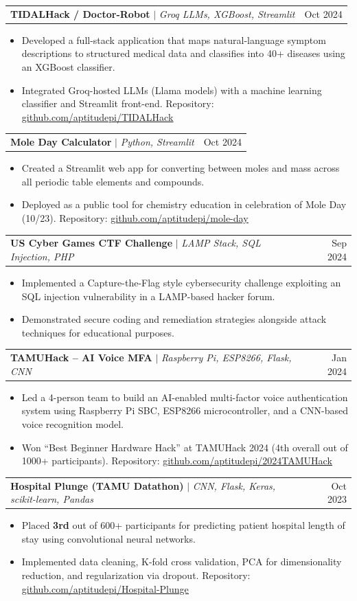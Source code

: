 \documentclass[letterpaper,11pt]{article}
\makeatletter
\newcommand{\resumeItem}[1]{
  \item\small{
    {#1 \vspace{-2pt}}
  }
}
\newcommand{\resumeProjectHeading}[2]{
    \item
    \begin{tabular*}{0.97\textwidth}{l@{\extracolsep{\fill}}r}
      \small#1 & #2 \\
    \end{tabular*}\vspace{-7pt}
}
\newcommand{\resumeItemListStart}{\begin{itemize}}
\newcommand{\resumeItemListEnd}{\end{itemize}\vspace{-5pt}}
\makeatother
\begin{document}
    \resumeProjectHeading
      {\textbf{TIDALHack / Doctor-Robot} $|$ \emph{Groq LLMs, XGBoost, Streamlit}}{Oct 2024}
      \resumeItemListStart
        \resumeItem{Developed a full-stack application that maps natural-language symptom descriptions to structured medical data and classifies into 40+ diseases using an XGBoost classifier.}
        \resumeItem{Integrated Groq-hosted LLMs (Llama models) with a machine learning classifier and Streamlit front-end. Repository: \href{https://github.com/aptitudepi/TIDALHack}{\underline{github.com/aptitudepi/TIDALHack}}}
      \resumeItemListEnd

    \resumeProjectHeading
      {\textbf{Mole Day Calculator} $|$ \emph{Python, Streamlit}}{Oct 2024}
      \resumeItemListStart
        \resumeItem{Created a Streamlit web app for converting between moles and mass across all periodic table elements and compounds.}
        \resumeItem{Deployed as a public tool for chemistry education in celebration of Mole Day (10/23). Repository: \href{https://github.com/aptitudepi/mole-day}{\underline{github.com/aptitudepi/mole-day}}}
      \resumeItemListEnd

    \resumeProjectHeading
      {\textbf{US Cyber Games CTF Challenge} $|$ \emph{LAMP Stack, SQL Injection, PHP}}{Sep 2024}
      \resumeItemListStart
        \resumeItem{Implemented a Capture-the-Flag style cybersecurity challenge exploiting an SQL injection vulnerability in a LAMP-based hacker forum.}
        \resumeItem{Demonstrated secure coding and remediation strategies alongside attack techniques for educational purposes.}
      \resumeItemListEnd

    \resumeProjectHeading
      {\textbf{TAMUHack -- AI Voice MFA} $|$ \emph{Raspberry Pi, ESP8266, Flask, CNN}}{Jan 2024}
      \resumeItemListStart
        \resumeItem{Led a 4-person team to build an AI-enabled multi-factor voice authentication system using Raspberry Pi SBC, ESP8266 microcontroller, and a CNN-based voice recognition model.}
        \resumeItem{Won ``Best Beginner Hardware Hack'' at TAMUHack 2024 (4th overall out of 1000+ participants). Repository: \href{https://github.com/aptitudepi/2024TAMUHack}{\underline{github.com/aptitudepi/2024TAMUHack}}}
      \resumeItemListEnd

    \resumeProjectHeading
      {\textbf{Hospital Plunge (TAMU Datathon)} $|$ \emph{CNN, Flask, Keras, scikit-learn, Pandas}}{Oct 2023}
      \resumeItemListStart
        \resumeItem{Placed \textbf{3rd} out of 600+ participants for predicting patient hospital length of stay using convolutional neural networks.}
        \resumeItem{Implemented data cleaning, K-fold cross validation, PCA for dimensionality reduction, and regularization via dropout. Repository: \href{https://github.com/aptitudepi/Hospital-Plunge}{\underline{github.com/aptitudepi/Hospital-Plunge}}}
      \resumeItemListEnd
\end{document}
